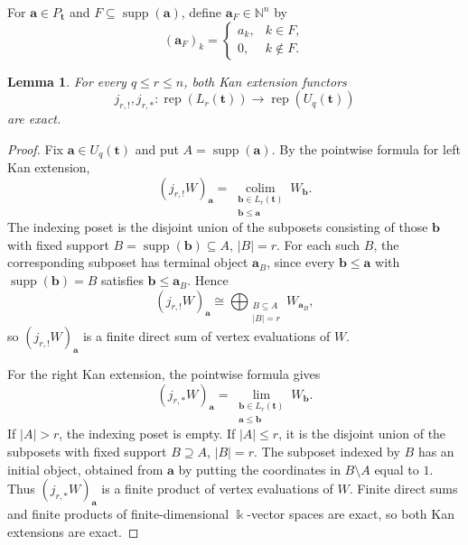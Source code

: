 \documentclass[12pt,reqno]{amsart}
\newtheorem{lemma}[theorem]{Lemma}
\theoremstyle{definition}
\theoremstyle{remark}
\newcommand{\Rep}{\operatorname{rep}}
\begin{document}
For $\mathbf a\in P_{\mathbf t}$ and $F\subseteq\operatorname{supp}(\mathbf a)$, define $\mathbf a_F\in \mathbb N^n$ by
\[
(\mathbf a_F)_k=
\begin{cases}
a_k,&k\in F,\\
0,&k\notin F.
\end{cases}
\]

\begin{lemma}\label{lem:stratum-kan-exact}
For every $q\le r\le n$, both Kan extension functors
\[
j_{r,!},j_{r,*}:\Rep(L_r(\mathbf t))\longrightarrow\Rep(U_q(\mathbf t))
\]
are exact.
\end{lemma}

\begin{proof}
Fix $\mathbf a\in U_q(\mathbf t)$ and put
$A=\operatorname{supp}(\mathbf a)$.  By the pointwise formula for left Kan
extension,
\[
(j_{r,!}W)_{\mathbf a}
=
\operatorname*{colim}_{\substack{\mathbf b\in L_r(\mathbf t)\\
\mathbf b\le\mathbf a}} W_{\mathbf b}.
\]
The indexing poset is the disjoint union of the subposets consisting of those
$\mathbf b$ with fixed support
$B=\operatorname{supp}(\mathbf b)\subseteq A$, $|B|=r$.  For each such $B$,
the corresponding subposet has terminal object $\mathbf a_B$, since every
$\mathbf b\le\mathbf a$ with $\operatorname{supp}(\mathbf b)=B$ satisfies
$\mathbf b\le\mathbf a_B$.  Hence
\[
(j_{r,!}W)_{\mathbf a}
\cong
\bigoplus_{\substack{B\subseteq A\\|B|=r}} W_{\mathbf a_B},
\]
so $(j_{r,!}W)_{\mathbf a}$ is a finite direct sum of vertex evaluations of
$W$.

For the right Kan extension, the pointwise formula gives
\[
(j_{r,*}W)_{\mathbf a}
=
\operatorname*{lim}_{\substack{\mathbf b\in L_r(\mathbf t)\\
\mathbf a\le\mathbf b}} W_{\mathbf b}.
\]
If $|A|>r$, the indexing poset is empty.  If $|A|\le r$, it is the disjoint
union of the subposets with fixed support $B\supseteq A$, $|B|=r$.  The
subposet indexed by $B$ has an initial object, obtained from $\mathbf a$ by
putting the coordinates in $B\setminus A$ equal to $1$.  Thus
$(j_{r,*}W)_{\mathbf a}$ is a finite product of vertex evaluations of $W$.
Finite direct sums and finite products of finite-dimensional $\Bbbk$-vector spaces
are exact, so both Kan extensions are exact.
\end{proof}
\end{document}
